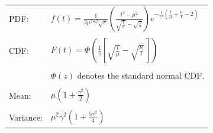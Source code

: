 \documentclass[12pt]{article}
\begin{document}
\pagestyle{empty}
\Large
{}
\pagecolor{ehandbook}

\bf
\boldmath

\hspace*{-.5in}
\begin{tabular}{ll}
PDF:                 & $\displaystyle{f(t) = \frac{1}{2 \mu^2 \gamma^2\sqrt{\pi}} \left( \frac{t^2 - \mu^2}{\sqrt{\frac{t}{u}} - \sqrt{\frac{u}{t}}} \right) e^{-\frac{1}{\gamma^2} \left( \frac{t}{\mu} + \frac{\mu}{t} -2 \right)}}$ \\
                       & \\
CDF:                 & $\displaystyle{F(t) = \Phi \left( \frac{1}{\gamma} \left[ \sqrt{\frac{t}{\mu}} - \sqrt{\frac{\mu}{t}} \, \right] \right)}$ \\
                     & \\
                     & $\Phi(z)$ denotes the standard normal CDF.\\
                     & \\
Mean:                & $\displaystyle{\mu \left( 1 + \frac{\gamma^2}{2} \right)}$ \\
                     & \\
Variance:            & $\displaystyle{\mu^2 \gamma^2 \left( 1 + \frac{5 \gamma^2}{4} \right)}$ 
\end{tabular}
  
   
\end{document}
